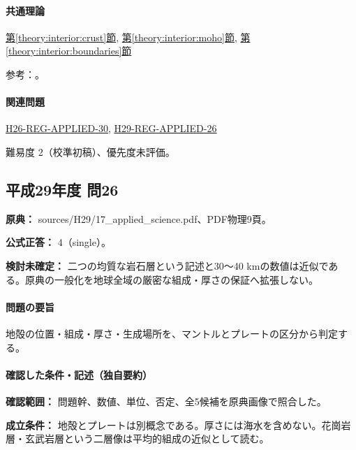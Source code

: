 \paragraph{共通理論} \hyperref[theory:interior:crust]{第\ref*{theory:interior:crust}節}, \hyperref[theory:interior:moho]{第\ref*{theory:interior:moho}節}, \hyperref[theory:interior:boundaries]{第\ref*{theory:interior:boundaries}節}

\par 参考：\cite{usgs_interior_structure,usgs_plate_boundaries,umich_crust_teaching}。

\paragraph{関連問題} \hyperref[q:h26-reg-applied-30]{H26-REG-APPLIED-30}, \hyperref[q:h29-reg-applied-26]{H29-REG-APPLIED-26}

\par 難易度 2（校準初稿）、優先度未評価。

\subsection{平成29年度 問26}
\label{q:h29-reg-applied-26}

\noindent\textbf{原典：} sources/H29/17\_applied\_science.pdf、PDF物理9頁。

\textbf{公式正答：} 4（single）。

\par\textbf{検討未確定：} 二つの均質な岩石層という記述と30〜40 kmの数値は近似である。原典の一般化を地球全域の厳密な組成・厚さの保証へ拡張しない。

\paragraph{問題の要旨} 地殻の位置・組成・厚さ・生成場所を、マントルとプレートの区分から判定する。

\paragraph{確認した条件・記述（独自要約）}\mbox{}\par

\noindent\textbf{確認範囲：} 問題幹、数値、単位、否定、全5候補を原典画像で照合した。\par

\noindent\textbf{成立条件：} 地殻とプレートは別概念である。厚さには海水を含めない。花崗岩層・玄武岩層という二層像は平均的組成の近似として読む。\par

